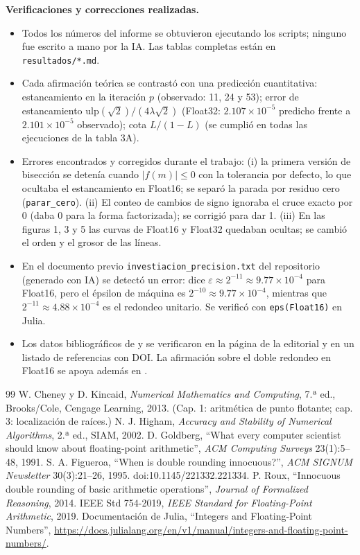 \documentclass[11pt]{article}
\begin{document}
\textbf{Verificaciones y correcciones realizadas.}
\begin{itemize}
\item Todos los números del informe se obtuvieron ejecutando los scripts; ninguno fue escrito a mano por la IA. Las tablas completas están en \texttt{resultados/*.md}.
\item Cada afirmación teórica se contrastó con una predicción cuantitativa: estancamiento en la iteración $p$ (observado: 11, 24 y 53); error de estancamiento $\mathrm{ulp}(\sqrt2)/(4\lambda\sqrt2)$ (Float32: $2.107\times10^{-5}$ predicho frente a $2.101\times10^{-5}$ observado); cota $L/(1-L)$ (se cumplió en todas las ejecuciones de la tabla 3A).
\item Errores encontrados y corregidos durante el trabajo: (i) la primera versión de bisección se detenía cuando $|f(m)|\le0$ con la tolerancia por defecto, lo que ocultaba el estancamiento en Float16; se separó la parada por residuo cero (\texttt{parar\_cero}). (ii) El conteo de cambios de signo ignoraba el cruce exacto por $0$ (daba 0 para la forma factorizada); se corrigió para dar 1. (iii) En las figuras 1, 3 y 5 las curvas de Float16 y Float32 quedaban ocultas; se cambió el orden y el grosor de las líneas.
\item En el documento previo \texttt{investiacion\_precision.txt} del repositorio (generado con IA) se detectó un error: dice $\varepsilon\approx2^{-11}\approx9.77\times10^{-4}$ para Float16, pero el épsilon de máquina es $2^{-10}\approx9.77\times10^{-4}$, mientras que $2^{-11}\approx4.88\times10^{-4}$ es el redondeo unitario. Se verificó con \texttt{eps(Float16)} en Julia.
\item Los datos bibliográficos de \cite{cheney} y \cite{figueroa} se verificaron en la página de la editorial y en un listado de referencias con DOI. La afirmación sobre el doble redondeo en Float16 se apoya además en \cite{roux}.
\end{itemize}

\begin{thebibliography}{99}
 W. Cheney y D. Kincaid, \emph{Numerical Mathematics and Computing}, 7.ª ed., Brooks/Cole, Cengage Learning, 2013. (Cap. 1: aritmética de punto flotante; cap. 3: localización de raíces.)
 N. J. Higham, \emph{Accuracy and Stability of Numerical Algorithms}, 2.ª ed., SIAM, 2002.
 D. Goldberg, ``What every computer scientist should know about floating-point arithmetic'', \emph{ACM Computing Surveys} 23(1):5--48, 1991.
 S. A. Figueroa, ``When is double rounding innocuous?'', \emph{ACM SIGNUM Newsletter} 30(3):21--26, 1995. doi:10.1145/221332.221334.
 P. Roux, ``Innocuous double rounding of basic arithmetic operations'', \emph{Journal of Formalized Reasoning}, 2014.
 IEEE Std 754-2019, \emph{IEEE Standard for Floating-Point Arithmetic}, 2019.
 Documentación de Julia, ``Integers and Floating-Point Numbers'', \url{https://docs.julialang.org/en/v1/manual/integers-and-floating-point-numbers/}.
\end{thebibliography}
\end{document}
